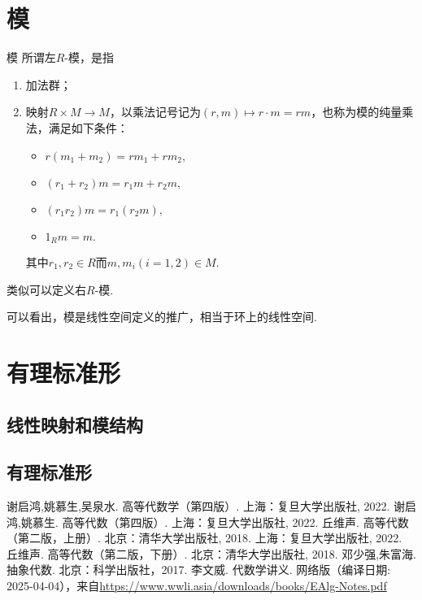 \documentclass[12pt, a4paper]{ctexart}
\begin{document}
\section{模}
\begin{definition}{模}{}
	所谓左$R$-模，是指\begin{enumerate}
		\item 加法群；
		\item 映射$R\times M\to M$，以乘法记号记为$(r,m)\mapsto r\cdot m=rm$，也称为模的纯量乘法，满足如下条件：\begin{itemize}
			\item $r(m_1+m_2)=rm_1+rm_2,$
			\item $(r_1+r_2)m=r_1m+r_2m,$
			\item $(r_1r_2)m=r_1(r_2m),$
			\item $1_Rm=m.$
		\end{itemize}
		其中$r_1,r_2\in R$而$m,m_i(i=1,2)\in M.$
		
	\end{enumerate}
	类似可以定义右$R$-模.  
\end{definition}
可以看出，模是线性空间定义的推广，相当于环上的线性空间. 

\section{有理标准形}
\subsection{线性映射和模结构}
\subsection{有理标准形}
\newpage
\begin{thebibliography}{99}  
	
	谢启鸿,姚慕生,吴泉水. 高等代数学（第四版）. 上海：复旦大学出版社, 2022.
	谢启鸿,姚慕生. 高等代数（第四版）. 上海：复旦大学出版社, 2022.
	丘维声. 高等代数（第二版，上册）. 北京：清华大学出版社, 2018.  上海：复旦大学出版社, 2022.
	丘维声. 高等代数（第二版，下册）. 北京：清华大学出版社, 2018. 
	邓少强,朱富海. 抽象代数. 北京：科学出版社，2017. 
	李文威. 代数学讲义. 网络版（编译日期: 2025-04-04），来自\url{https://www.wwli.asia/downloads/books/EAlg-Notes.pdf}
	
\end{thebibliography}
\end{document}
